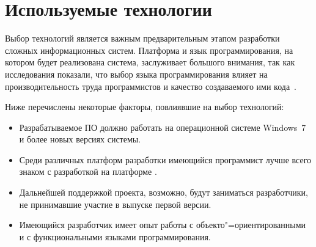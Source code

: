 \lstset{style=fsharpstyle}

\section{Используемые технологии} 
\label{sec:practice:technology_used}

Выбор технологий является важным предварительным этапом разработки сложных информационных систем.
Платформа и язык программирования, на котором будет реализована система, заслуживает большого внимания, так как исследования показали, что выбор языка программирования влияет на производительность труда программистов и качество создаваемого ими кода~\cite[c.~59]{mcconnell_2005}.

Ниже перечислены некоторые факторы, повлиявшие на выбор технологий:
\begin{itemize}
\item Разрабатываемое ПО должно работать на операционной системе Windows~7 и более новых версиях системы.
\item Среди различных платформ разработки имеющийся программист лучше всего знаком с разработкой на платформе \dotnet{}.
\item Дальнейшей поддержкой проекта, возможно, будут заниматься разработчики, не принимавшие участие в выпуске первой версии.
\item Имеющийся разработчик имеет опыт работы с объекто"=ориентированными и с функциональными языками программирования.
\end{itemize}

